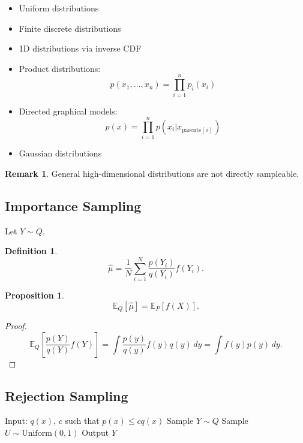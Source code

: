 \documentclass[12pt,oneside]{book}
\numberwithin{equation}{section}
\theoremstyle{definition}
\newtheorem{definition}{Definition}[section]
\newtheorem{remark}{Remark}[section]
\theoremstyle{plain}
\newtheorem{proposition}{Proposition}[section]
\theoremstyle{remark}
\newcommand{\E}{\mathbb{E}}
\begin{document}
\begin{itemize}
\item Uniform distributions
\item Finite discrete distributions
\item 1D distributions via inverse CDF
\item Product distributions:
\[
p(x_1,\dots,x_n) = \prod_{i=1}^n p_i(x_i)
\]
\item Directed graphical models:
\[
p(x) = \prod_{i=1}^n p(x_i | x_{\mathrm{parents}(i)})
\]
\item Gaussian distributions
\end{itemize}

\begin{remark}
General high-dimensional distributions are not directly sampleable.
\end{remark}


\subsection{Importance Sampling}

Let $Y \sim Q$.

\begin{definition}
\[
\widehat{\mu}
=
\frac{1}{N}\sum_{i=1}^N \frac{p(Y_i)}{q(Y_i)} f(Y_i).
\]
\end{definition}

\begin{proposition}
\[
\E_Q[\widehat{\mu}] = \E_P[f(X)].
\]
\end{proposition}

\begin{proof}
\[
\E_Q\left[\frac{p(Y)}{q(Y)}f(Y)\right]
=
\int \frac{p(y)}{q(y)} f(y) q(y)\,dy
=
\int f(y)p(y)\,dy.
\]
\end{proof}


\subsection{Rejection Sampling}

\begin{algorithm}
\caption{Rejection sampling}
\begin{algorithmic}
\State Input: $q(x)$, $c$ such that $p(x) \le c q(x)$
\Repeat
\State Sample $Y \sim Q$
\State Sample $U \sim \mathrm{Uniform}(0,1)$
\State Output $Y$
\end{algorithmic}
\end{algorithm}
\end{document}
